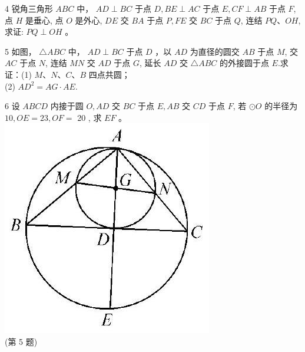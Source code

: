 \documentclass[10pt]{article}
\begin{document}
4 锐角三角形 $A B C$ 中， $A D \perp B C$ 于点 $D, B E \perp A C$ 于点 $E, C F \perp A B$ 于点 $F$, 点 $H$ 是垂心, 点 $O$ 是外心, $D E$ 交 $B A$ 于点 $P, F E$ 交 $B C$ 于点 $Q$, 连结 $P Q 、 O H$, 求证: $P Q \perp O H$ 。

5 如图， $\triangle A B C$ 中， $A D \perp B C$ 于点 $D$ ，以 $A D$ 为直径的圆交 $A B$ 于点 $M$, 交 $A C$ 于点 $N$, 连结 $M N$ 交 $A D$ 于点 $G$, 延长 $A D$ 交 $\triangle A B C$ 的外接圆于点 $E$.求证：(1) $M 、 N 、 C 、 B$ 四点共圆；\\
(2) $A D^{2}=A G \cdot A E$.

6 设 $A B C D$ 内接于圆 $O, A D$ 交 $B C$ 于点 $E, A B$ 交 $C D$ 于点 $F$, 若 $\odot O$ 的半径为 $10, O E=23, O F=$ 20 , 求 $E F$ 。\\
\includegraphics[max width=\textwidth, center]{2024_10_30_66b8e5e701da2093c133g-064(2)}\\
(第 5 题)
\end{document}
